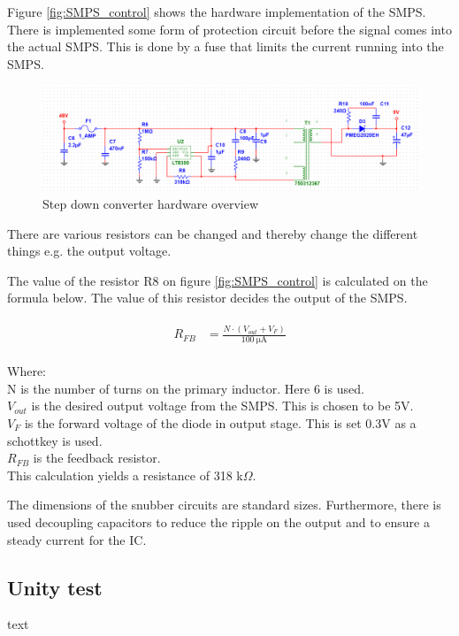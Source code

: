 Figure \vref{fig:SMPS_control} shows the hardware implementation of the SMPS. There is implemented some form of protection circuit before the signal comes into the actual SMPS. This is done by a fuse that limits the current running into the SMPS. 

\begin{figure}[H]
	\centering
	\includegraphics[width=0.7\linewidth]{Hardware/Pictures/SMPS_hw}
	\caption{Step down converter hardware overview}
	\label{fig:SMPS_control}
\end{figure}

There are various resistors can be changed and thereby change the different things e.g. the output voltage. 

The value of the resistor R8 on figure \vref{fig:SMPS_control} is calculated on the formula below. The value of this resistor decides the output of the SMPS.

\begin{align}
	\begin{split}
		R_{FB} &= \frac{N \cdot (V_{out}+V_F)}{\SI{100}{\micro \ampere}}
	\end{split}
\end{align}

Where:\\
N is the number of turns on the primary inductor. Here 6 is used. \\
$V_{out}$ is the desired output voltage from the SMPS. This is chosen to be 5V. \\
$V_F$ is the forward voltage of the diode in output stage. This is set 0.3V as a schottkey is used. \\
$R_{FB}$ is the feedback resistor. \\
This calculation yields a resistance of 318 k$\Omega$.

The dimensions of the snubber circuits are standard sizes. Furthermore, there is used decoupling capacitors to reduce the ripple on the output and to ensure a steady current for the IC.

\subsection{Unity test}
text
